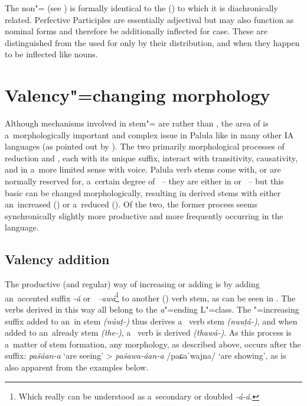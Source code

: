 The non"=  (see ) is formally identical to the   () to which it is diachronically related. Perfective Participles are essentially adjectival but may also function as nominal forms and therefore be additionally inflected for case. These are distinguished from the  used for   only by their distribution, and when they happen to be inflected like nouns.


\section{Valency"=changing morphology}
\label{sec:8-5}

Although mechanisms involved in stem"= are  rather than , the area of  is a~morphologically important and complex issue in Palula like in many other IA languages (as pointed out by \citealt[315]{masica1991}). The two primarily morphological processes of  reduction and , each with its unique suffix, interact with transitivity, causativity, and in a~more limited sense with voice. Palula verb stems come with, or are normally reserved for, a~certain degree of ~-- they are either in or ~-- but this basic  can be changed morphologically, resulting in derived stems with either an~increased  () or a~reduced  (). Of the two, the former process seems synchronically slightly more productive and more frequently occurring in the language.


\subsection{Valency addition}
\label{subsec:8-5-1}

The productive (and regular) way of increasing or adding  is by adding an~accented suffix
\textit{-á} or \textit{~--awá}\footnote{Which really can be understood as a~secondary or
  doubled  \textit{-á-á}.} to another () verb stem, as can be seen in
. The verbs derived in this way all belong to the \textit{a}"=ending L"=class. The "=increasing suffix added to an~in  stem \mbox{\textit{(núuṭ-)}} thus derives a~  verb stem \textit{(nuuṭá-)}, and when added to an~already  stem \textit{(the-)}, a~ verb is derived \textit{(thawá-)}. As this process is a~matter of stem formation, any  morphology, as described above, occurs after the  suffix: \textit{pašáan-a} `are seeing' {\textgreater} \textit{pašawa-áan-a} /paɕaˈwajna/ `are showing', as is also apparent from the examples below.


